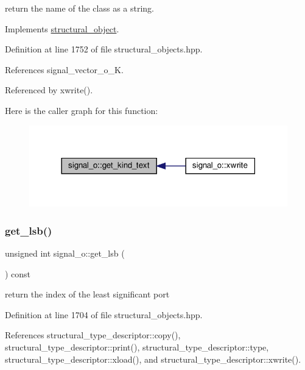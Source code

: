 return the name of the class as a string. 



Implements \hyperlink{classstructural__object_a36c541b52425c4de8fa45d79285a97e7}{structural\+\_\+object}.



Definition at line 1752 of file structural\+\_\+objects.\+hpp.



References signal\+\_\+vector\+\_\+o\+\_\+K.



Referenced by xwrite().

Here is the caller graph for this function\+:
\nopagebreak
\begin{figure}[H]
\begin{center}
\leavevmode
\includegraphics[width=318pt]{db/d5c/classsignal__o_a66d4342659804e8d1ed84d471313fc68_icgraph}
\end{center}
\end{figure}
\mbox{\label{classsignal__o_a7f74d2fd1067b338fbf0d8c404af1114}} 
\subsubsection{\texorpdfstring{get\+\_\+lsb()}{get\_lsb()}}
{\footnotesize\ttfamily unsigned int signal\+\_\+o\+::get\+\_\+lsb (\begin{DoxyParamCaption}{ }\end{DoxyParamCaption}) const\hspace{0.3cm}{\ttfamily [inline]}}



return the index of the least significant port 



Definition at line 1704 of file structural\+\_\+objects.\+hpp.



References structural\+\_\+type\+\_\+descriptor\+::copy(), structural\+\_\+type\+\_\+descriptor\+::print(), structural\+\_\+type\+\_\+descriptor\+::type, structural\+\_\+type\+\_\+descriptor\+::xload(), and structural\+\_\+type\+\_\+descriptor\+::xwrite().

